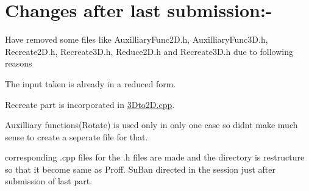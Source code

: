 \section*{Changes after last submission\+:-\/}

Have removed some files like Auxilliary\+Func2\+D.\+h, Auxilliary\+Func3\+D.\+h, Recreate2\+D.\+h, Recreate3\+D.\+h, Reduce2\+D.\+h and Recreate3\+D.\+h due to following reasons
\begin{DoxyEnumerate}
\item The input taken is already in a reduced form.
\item Recreate part is incorporated in \hyperlink{3_dto2_d_8cpp}{3\+Dto2\+D.\+cpp}.
\item Auxilliary functions(\+Rotate) is used only in only one case so didn\textquotesingle{}t make much sense to create a seperate file for that.
\item corresponding .cpp files for the .h files are made and the directory is restructure so that it become same as Proff. Su\+Ban directed in the session just after submission of last part. 
\end{DoxyEnumerate}